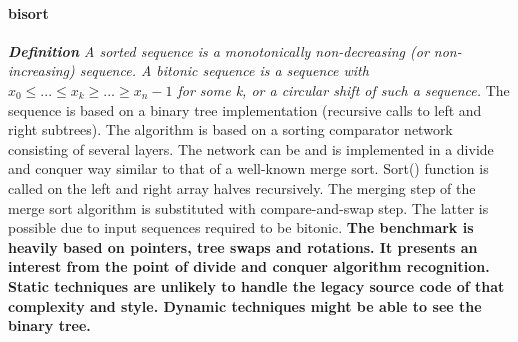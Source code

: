 \paragraph{bisort}
\textit{\textbf{Definition} A sorted sequence is a monotonically non-decreasing (or non-increasing) sequence. A bitonic sequence is a sequence with $x_{0} \leq ... \leq x_{k} \geq ... \geq x_{n} - 1$ for some k, or a circular shift of such a sequence.}\newline\null
\quad The sequence is based on a binary tree implementation (recursive calls to left and right subtrees). The algorithm is based on a sorting comparator network consisting of several layers. The network can be and is implemented in a divide and conquer way similar to that of a well-known merge sort. Sort() function is called on the left and right array halves recursively. The merging step of the merge sort algorithm is substituted with compare-and-swap step. The latter is possible due to input sequences required to be bitonic.
\quad\textbf{The benchmark is heavily based on pointers, tree swaps and rotations. It presents an interest from the point of divide and conquer algorithm recognition. Static techniques are unlikely to handle the legacy source code of that complexity and style. Dynamic techniques might be able to see the binary tree.}

